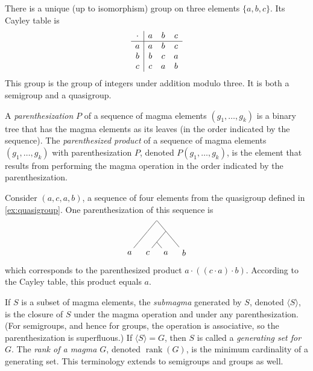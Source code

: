 \documentclass{article}
\newcommand{\gen}[1]{\langle #1 \rangle}
\DeclareMathOperator{\rank}{rank}
\begin{document}
\begin{example}
  There is a unique (up to isomorphism) group on three elements $\{a, b, c\}$.
  Its Cayley table is
  \begin{equation*}
    \begin{array}{c | c c c}
      \cdot & a & b & c \\
      \hline
      a & a & b & c \\
      b & b & c & a \\
      c & c & a & b \\
    \end{array}
  \end{equation*}
  This group is the group of integers under addition modulo three.
  It is both a semigroup and a quasigroup.
\end{example}

A \emph{parenthesization} $P$ of a sequence of magma elements $(g_1, \dotsc, g_k)$ is a binary tree that has the magma elements as its leaves (in the order indicated by the sequence).
The \emph{parenthesized product} of a sequence of magma elements $(g_1, \dotsc, g_k)$ with parenthesization $P$, denoted $P(g_1, \dotsc, g_k)$, is the element that results from performing the magma operation in the order indicated by the parenthesization.

\begin{example}
  Consider $(a, c, a, b)$, a sequence of four elements from the quasigroup defined in \autoref{ex:quasigroup}.
  One parenthesization of this sequence is
  \begin{equation*}
    \begin{tikzpicture}[xscale=0.5, yscale=0.3]
      \node[minimum size=0pt, inner sep=0pt] {}
      child {
        child {
          child {node {$a$}}
          child[color=white] {}
        }
        child[color=white] {}
      }
      child {
        child {
          child {node {$c$}}
          child {node {$a$}}
        }
        child {
          child[color=white] {}
          child {node {$b$}}
        }
      };
    \end{tikzpicture}
  \end{equation*}
  which corresponds to the parenthesized product $a \cdot ((c \cdot a) \cdot b)$.
  According to the Cayley table, this product equals $a$.
\end{example}

If $S$ is a subset of magma elements, the \emph{submagma} generated by $S$, denoted $\gen{S}$, is the closure of $S$ under the magma operation and under any parenthesization.
(For semigroups, and hence for groups, the operation is associative, so the parenthesization is superfluous.)
If $\gen{S} = G$, then $S$ is called a \emph{generating set for $G$}.
The \emph{rank of a magma $G$}, denoted $\rank(G)$, is the minimum cardinality of a generating set.
This terminology extends to semigroups and groups as well.
\end{document}
